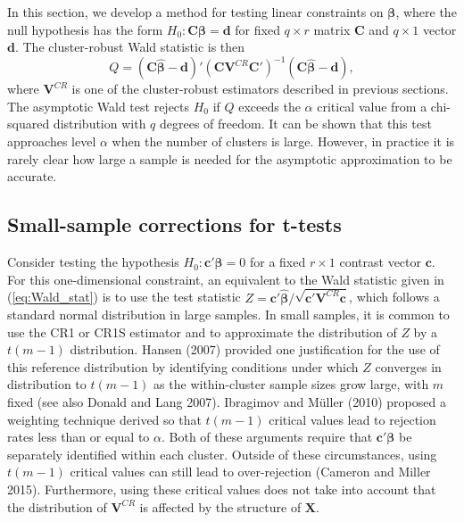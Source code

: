 \documentclass[12pt]{article}
\begin{document}
In this section, we develop a method for testing linear constraints on
\(\boldsymbol\beta\), where the null hypothesis has the form
\(H_0: \mathbf{C}\boldsymbol\beta = \mathbf{d}\) for fixed
\(q \times r\) matrix \(\mathbf{C}\) and \(q \times 1\) vector
\(\mathbf{d}\). The cluster-robust Wald statistic is then
\begin{equation}
\label{eq:Wald_stat}
Q = \left(\mathbf{C}\boldsymbol{\hat\beta} - \mathbf{d}\right)'\left(\mathbf{C} \mathbf{V}^{CR} \mathbf{C}'\right)^{-1}\left(\mathbf{C}\boldsymbol{\hat\beta} - \mathbf{d}\right),
\end{equation} where \(\mathbf{V}^{CR}\) is one of the cluster-robust
estimators described in previous sections. The asymptotic Wald test
rejects \(H_0\) if \(Q\) exceeds the \(\alpha\) critical value from a
chi-squared distribution with \(q\) degrees of freedom. It can be shown
that this test approaches level \(\alpha\) when the number of clusters
is large. However, in practice it is rarely clear how large a sample is
needed for the asymptotic approximation to be accurate.

\hypertarget{subsec:t-tests}{%
\subsection{Small-sample corrections for t-tests}\label{subsec:t-tests}}

Consider testing the hypothesis \(H_0: \mathbf{c}'\boldsymbol\beta = 0\)
for a fixed \(r \times 1\) contrast vector \(\mathbf{c}\). For this
one-dimensional constraint, an equivalent to the Wald statistic given in
(\ref{eq:Wald_stat}) is to use the test statistic
\(Z = \mathbf{c}'\boldsymbol{\hat\beta} / \sqrt{\mathbf{c}'\mathbf{V}^{CR}\mathbf{c}}\),
which follows a standard normal distribution in large samples. In small
samples, it is common to use the CR1 or CR1S estimator and to
approximate the distribution of \(Z\) by a \(t(m - 1)\) distribution.
Hansen (2007) provided one justification for the use of this reference
distribution by identifying conditions under which \(Z\) converges in
distribution to \(t(m-1)\) as the within-cluster sample sizes grow
large, with \(m\) fixed (see also Donald and Lang 2007). Ibragimov and
Müller (2010) proposed a weighting technique derived so that \(t(m-1)\)
critical values lead to rejection rates less than or equal to
\(\alpha\). Both of these arguments require that
\(\mathbf{c}'\boldsymbol\beta\) be separately identified within each
cluster. Outside of these circumstances, using \(t(m-1)\) critical
values can still lead to over-rejection (Cameron and Miller 2015).
Furthermore, using these critical values does not take into account that
the distribution of \(\mathbf{V}^{CR}\) is affected by the structure of
\(\mathbf{X}\).
\end{document}
